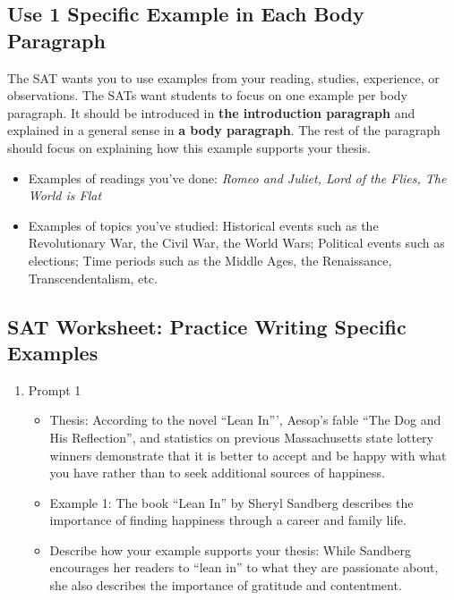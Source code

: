\begin{enumerate}
\begin{enumerate}
\begin{itemize}
\end{itemize}

\subsection{Use 1 Specific Example in Each Body Paragraph}

The SAT wants you to use examples from your reading, studies, experience, or observations. The SATs want students to focus on one example per body paragraph. It should be introduced in \textbf{the introduction paragraph} and explained in a general sense in \textbf{a body paragraph}. The rest of the paragraph should focus on explaining how this example supports your thesis.

\begin{itemize}
\item Examples of readings you've done: \textit{Romeo and Juliet, Lord of the Flies, The World is Flat}
\item Examples of topics you've studied: Historical events such as the Revolutionary War, the Civil War, the World Wars; Political events such as elections; Time periods such as the Middle Ages, the Renaissance, Transcendentalism, etc.
\end{itemize}

\end{enumerate}

\subsection{SAT Worksheet: Practice Writing Specific Examples}
\begin{enumerate}
\item Prompt 1

\begin{itemize}
\item Thesis: According to the novel ``Lean In''', Aesop's fable ``The Dog and His Reflection'', and statistics on previous Massachusetts state lottery winners demonstrate that it is better to accept and be happy with what you have rather than to seek additional sources of happiness. 
\item Example 1: The book ``Lean In'' by Sheryl Sandberg describes the importance of finding happiness through a career and family life. 
\item Describe how your example supports your thesis: While Sandberg encourages her readers to ``lean in'' to what they are passionate about, she also describes the importance of gratitude and contentment. 


\end{itemize}
\end{enumerate}
\end{enumerate}
